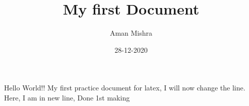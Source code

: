 \documentclass{article}
\title{My first Document}
\date{28-12-2020}
\author{Aman Mishra}
\begin{document}
  \maketitle
  \newpage
  
  Hello World!! My first practice document for latex, I will now change the line.\\
  
  Here, I am in new line, Done 1st making 
\end{document}

